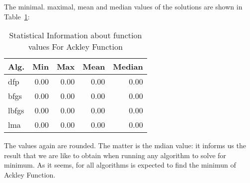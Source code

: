 The minimal. maximal, mean and median values of the solutions are shown in Table~\ref{function_values:ackley}:

\begin{table}[H]
\centering
\caption{Statistical Information about function values For Ackley Function}
\label{function_values:ackley}
\begin{tabular}{lrrrr}
\toprule
 Alg. &  Min &  Max &  Mean &  Median \\
\midrule
  dfp & 0.00 & 0.00 &  0.00 &    0.00 \\
 bfgs & 0.00 & 0.00 &  0.00 &    0.00 \\
lbfgs & 0.00 & 0.00 &  0.00 &    0.00 \\
  lma & 0.00 & 0.00 &  0.00 &    0.00 \\
\bottomrule
\end{tabular}
\end{table}

The values again are rounded. The matter is the mdian value: it informs us the result that
we are like to obtain when running any algorithm to solve for minimum. As it seems, for all
algorithms is expected to find the minimun of Ackley Function.

